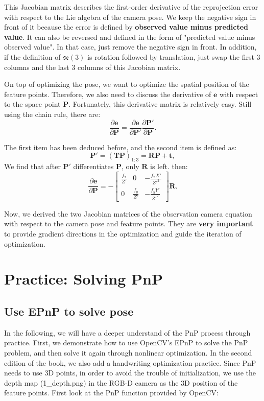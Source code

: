 This Jacobian matrix describes the first-order derivative of the reprojection error with respect to the Lie algebra of the camera pose. We keep the negative sign in front of it because the error is defined by \textbf{observed value minus predicted value}. It can also be reversed and defined in the form of "predicted value minus observed value". In that case, just remove the negative sign in front. In addition, if the definition of $\mathfrak{se}(3)$ is rotation followed by translation, just swap the first 3 columns and the last 3 columns of this Jacobian matrix.

On top of optimizing the pose, we want to optimize the spatial position of the feature points. Therefore, we also need to discuss the derivative of $\mathbf{e}$ with respect to the space point $\mathbf{P}$. Fortunately, this derivative matrix is relatively easy. Still using the chain rule, there are:
\begin{equation}
\frac{{\partial \mathbf{e}}}{{\partial \mathbf{P} }} = \frac{{\partial \mathbf{e}}}{{\partial \mathbf{P}'}}\frac{{\partial \mathbf{P}'}}{{\partial \mathbf{P} }}.
\end{equation}

The first item has been deduced before, and the second item is defined as:
\[
\mathbf{P}'= (\mathbf{T} \mathbf{P})_{1:3} = \mathbf{R} \mathbf{P} + \mathbf{t},
\]
We find that after $\mathbf{P}'$ differentiates $\mathbf{P}$, only $\mathbf{R}$ is left. then:
\begin{equation}
\label{eq:jacob-uv2P}
\frac{{\partial \mathbf{e}}}{{\partial \mathbf{P} }} = -\left[ 
\begin{array}{*{20}{c}}
	\frac{f_x}{Z'} & 0 &- \frac{f_x X'}{Z'^2} \\
	0 & \frac{f_y}{Z'} & - \frac{f_y Y'}{Z'^2}
\end{array} \right] \mathbf{R}.
\end{equation}

Now, we derived the two Jacobian matrices of the observation camera equation with respect to the camera pose and feature points. They are \textbf{very important} to provide gradient directions in the optimization and guide the iteration of optimization.

\section{Practice: Solving PnP}
\subsection{Use EPnP to solve pose}
In the following, we will have a deeper understand of the PnP process through practice. First, we demonstrate how to use OpenCV's EPnP to solve the PnP problem, and then solve it again through nonlinear optimization. In the second edition of the book, we also add a handwriting optimization practice. Since PnP needs to use 3D points, in order to avoid the trouble of initialization, we use the depth map (1_depth.png) in the RGB-D camera as the 3D position of the feature points. First look at the PnP function provided by OpenCV:

